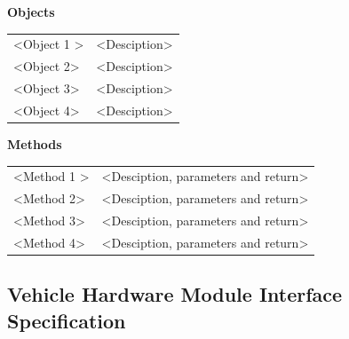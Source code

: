 \documentclass [10pt]{article}
\begin{document}
\textbf{Objects} 
\begin{longtable}{ p{ }  p{ }} \\ 

 
\rowcolor{tableCell} <Object 1 >& <Desciption> \\ 
<Object 2>& <Desciption> \\

\rowcolor{tableCell}<Object 3> & <Desciption> \\ 
<Object 4>& <Desciption> \\

\end{longtable}


\textbf{Methods} 
\begin{longtable}{ p{ }  p{ }} \\ 

 
\rowcolor{tableCell} <Method 1 >& <Desciption, parameters and return>\\ 
<Method 2>& <Desciption, parameters and return>\\

\rowcolor{tableCell}<Method 3> & <Desciption, parameters and return> \\ 
<Method 4>& <Desciption, parameters and return> \\

\end{longtable}




\subsection{Vehicle Hardware Module Interface Specification}
\newcommand{\VCMPWMsig}{set\_PWM(pin\_number, duty\_cycle) : void}
\newcommand{\VCMPWMdesc}{Used to output a PWM signal to a given GPIO pin at a given duty cycle.}

\newcommand{\VCMSPEEDsig}{get\_speed( ) : double}
\newcommand{\VCMSPEEDdesc}{Returns the current speed of the vehicle as measured by the Hall Effect sensor.}

\newcommand{\VCMSERVOsig}{set\_angle( angle : double ) : void}
\newcommand{\VCMSERVOdesc}{Outputs a physical signal to the servo to go to the specified angle.}

\newcommand{\VCMMOTORsig}{set\_speed( speed : double ) : void}
\newcommand{\VCMMOTORdesc}{Outputs a physical signal to the motor to go at a specified speed.}
\end{document}
